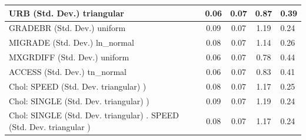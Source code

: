 \begin{table}
\begin{center}
\begin{tabular}{|l|l|c|c|c|l|}
			\hline
			URB (Std. Dev.) triangular &  & 0.06 & 0.07 & 0.87 & 0.39 \\
			\hline
			GRADEBR (Std. Dev.) uniform &  & 0.09 & 0.07 & 1.19 & 0.24 \\
			\hline
			MIGRADE (Std. Dev.) ln_normal &  & 0.08 & 0.07 & 1.14 & 0.26 \\
			\hline
			MXGRDIFF (Std. Dev.) uniform &  & 0.06 & 0.07 & 0.78 & 0.44 \\
			\hline
			ACCESS (Std. Dev.) tn_normal &  & 0.06 & 0.07 & 0.83 & 0.41 \\
			\hline
			 Chol: SPEED (Std. Dev. triangular) ) &  & 0.08 & 0.07 & 1.17 & 0.25 \\
			\hline
			 Chol: SINGLE (Std. Dev. triangular) ) &  & 0.09 & 0.07 & 1.19 & 0.24 \\
			\hline
			 Chol: SINGLE (Std. Dev. triangular) . SPEED (Std. Dev.   triangular ) &  & 0.08 & 0.07 & 1.17 & 0.24 \\
			\hline
		\end{tabular}
	\end{center}
\end{table}